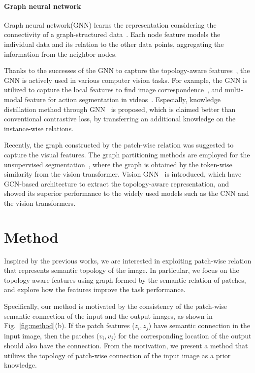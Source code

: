\documentclass[letterpaper]{article} %
\begin{document}
\paragraph{Graph neural network}

Graph neural network(GNN) learns the representation considering the connectivity of a graph-structured data~\cite{gcn, tagcn}. Each node feature models the individual data and its relation to the other data points, aggregating the information from the neighbor nodes.

Thanks to the successes of the GNN to capture the topology-aware features~\cite{lagraph, sep, structPool}, the GNN is actively used in various computer vision tasks.
For example, the GNN is utilized to capture the local features to find image correspondence~\cite{superGlue}, and multi-modal feature for action segmentation in videos~\cite{semantic2graph}. Especially, knowledge distillation method through GNN~\cite{hkd, gkd} is proposed, which is claimed better than conventional contrastive loss, by transferring an additional knowledge on the instance-wise relations.

Recently, the graph constructed by the patch-wise relation was suggested to capture the visual features. The graph partitioning methods are employed for the unsupervised segmentation~\cite{deepSpectral,tokenCut}, where the graph is obtained by the token-wise similarity from the vision transformer. Vision GNN~\cite{visionGNN} is introduced, which have GCN-based architecture to extract the topology-aware representation, and showed its superior performance to the widely used models such as the CNN and the vision transformers.




\section{Method}

Inspired by the previous works, we are interested in exploiting patch-wise relation that represents semantic topology of the image.
In particular, we focus on the topology-aware features using graph formed by the semantic relation of patches, and explore how the features improve the task performance.

Specifically, our method is motivated by the consistency of the patch-wise semantic connection of the input and the output images, as shown in Fig.~\ref{fig:method}(b). If the patch features ($z_i, z_j$) have semantic connection in the input image, then the patches ($v_i, v_j$) for the corresponding location of the output should also have the connection. From the motivation, we present a method that  utilizes the topology of patch-wise connection of the input image as a prior knowledge.
\end{document}
